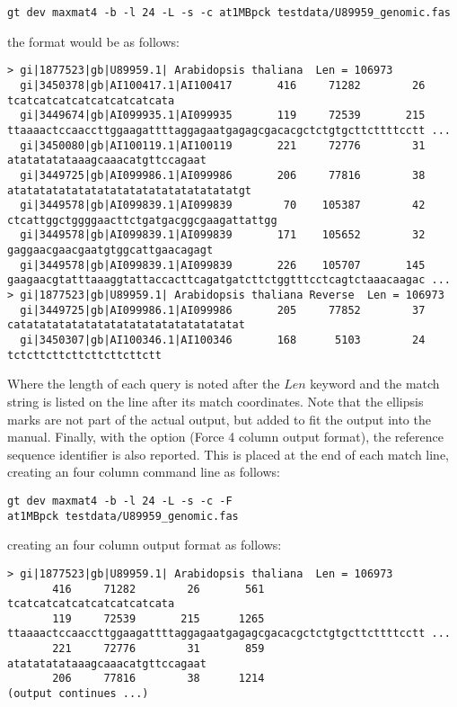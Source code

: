 \documentclass[12pt]{article}
\begin{document}
\begin{verbatim}
gt dev maxmat4 -b -l 24 -L -s -c at1MBpck testdata/U89959_genomic.fas
\end{verbatim}

the format would be as follows:

\begin{small}
\begin{verbatim}
> gi|1877523|gb|U89959.1| Arabidopsis thaliana  Len = 106973                                    
  gi|3450378|gb|AI100417.1|AI100417       416     71282        26
tcatcatcatcatcatcatcatcata
  gi|3449674|gb|AI099935.1|AI099935       119     72539       215
ttaaaactccaaccttggaagattttaggagaatgagagcgacacgctctgtgcttcttttcctt ...
  gi|3450080|gb|AI100119.1|AI100119       221     72776        31
atatatatataaagcaaacatgttccagaat
  gi|3449725|gb|AI099986.1|AI099986       206     77816        38
atatatatatatatatatatatatatatatatatatgt
  gi|3449578|gb|AI099839.1|AI099839        70    105387        42
ctcattggctggggaacttctgatgacggcgaagattattgg
  gi|3449578|gb|AI099839.1|AI099839       171    105652        32
gaggaacgaacgaatgtggcattgaacagagt
  gi|3449578|gb|AI099839.1|AI099839       226    105707       145
gaagaacgtatttaaaggtattaccacttcagatgatcttctggtttcctcagtctaaacaagac ...
> gi|1877523|gb|U89959.1| Arabidopsis thaliana Reverse  Len = 106973
  gi|3449725|gb|AI099986.1|AI099986       205     77852        37
catatatatatatatatatatatatatatatatatat
  gi|3450307|gb|AI100346.1|AI100346       168      5103        24
tctcttcttcttcttcttcttctt
\end{verbatim}
\end{small}

Where the length of each query is noted after the $Len$ keyword and 
the match string is listed on the line after its match coordinates. 
Note that the ellipsis marks are not part of the actual output, 
but added to fit the output into the manual. 
Finally, with the  option (Force 4 column output format), 
the reference sequence identifier is also reported. 
This is placed at the end of each match line, 
creating an four column command line as follows:

\begin{verbatim}
gt dev maxmat4 -b -l 24 -L -s -c -F 
at1MBpck testdata/U89959_genomic.fas
\end{verbatim}

creating an four column output format as follows:
\begin{small}
\begin{verbatim}
> gi|1877523|gb|U89959.1| Arabidopsis thaliana  Len = 106973                                    
       416     71282        26       561
tcatcatcatcatcatcatcatcata
       119     72539       215      1265
ttaaaactccaaccttggaagattttaggagaatgagagcgacacgctctgtgcttcttttcctt ...
       221     72776        31       859
atatatatataaagcaaacatgttccagaat
       206     77816        38      1214
(output continues ...)
\end{verbatim}
\end{small}




\end{document}
